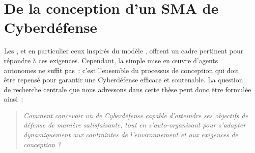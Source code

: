 

\section{De la conception d'un SMA de Cyberdéfense}\label{sec:problematique-sma}

Les , et en particulier ceux inspirés du modèle , offrent un cadre pertinent pour répondre à ces exigences. Cependant, la simple mise en œuvre d'agents autonomes ne suffit pas~: c'est l'ensemble du processus de conception qui doit être repensé pour garantir une Cyberdéfense efficace et soutenable.
La question de recherche centrale que nous adressons dans cette thèse peut donc être formulée ainsi~:

\begin{quote}
  \emph{Comment concevoir un  de Cyberdéfense capable d'atteindre ses objectifs de défense de manière satisfaisante, tout en s'auto-organisant pour s'adapter dynamiquement aux contraintes de l'environnement et aux exigences de conception ?}
\end{quote}

\medskip

